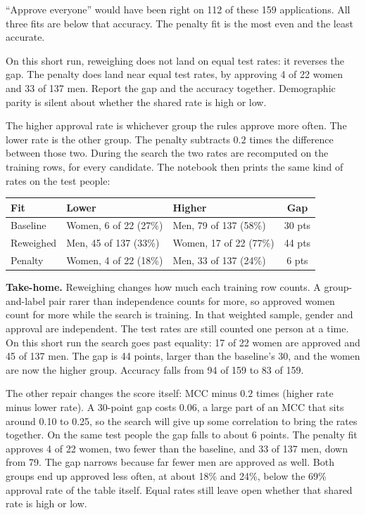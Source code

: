 \documentclass[11pt]{article}
\newcommand{\pct}[1]{\mbox{#1\%}}
\begin{document}
\noindent
``Approve everyone'' would have been right on 112 of these 159 applications. All three fits are below that accuracy. The penalty fit is the most even and the least accurate.

\begin{lesson}
On this short run, reweighing does not land on equal test rates: it reverses the gap. The penalty does land near equal test rates, by approving 4 of 22 women and 33 of 137 men. Report the gap and the accuracy together. Demographic parity is silent about whether the shared rate is high or low.
\end{lesson}

The higher approval rate is whichever group the rules approve more often. The lower rate is the other group. The penalty subtracts \(0.2\) times the difference between those two. During the search the two rates are recomputed on the training rows, for every candidate. The notebook then prints the same kind of rates on the test people:

\begin{table}[H]
\centering
\small
\begin{tabularx}{\textwidth}{@{}l Y Y c@{}}
\toprule
Fit & Lower & Higher & Gap \\
\midrule
Baseline & Women, 6 of 22 (\pct{27}) & Men, 79 of 137 (\pct{58}) & 30 pts \\
Reweighed & Men, 45 of 137 (\pct{33}) & Women, 17 of 22 (\pct{77}) & 44 pts \\
Penalty & Women, 4 of 22 (\pct{18}) & Men, 33 of 137 (\pct{24}) & 6 pts \\
\bottomrule
\end{tabularx}
\end{table}

\begin{plainwords}
\textbf{Take-home.} Reweighing changes how much each training row counts. A group-and-label pair rarer than independence counts for more, so approved women count for more while the search is training. In that weighted sample, gender and approval are independent. The test rates are still counted one person at a time. On this short run the search goes past equality: 17 of 22 women are approved and 45 of 137 men. The gap is 44 points, larger than the baseline's 30, and the women are now the higher group. Accuracy falls from 94 of 159 to 83 of 159.

The other repair changes the score itself: MCC minus \(0.2\) times (higher rate minus lower rate). A 30-point gap costs \(0.06\), a large part of an MCC that sits around 0.10 to 0.25, so the search will give up some correlation to bring the rates together. On the same test people the gap falls to about 6 points. The penalty fit approves 4 of 22 women, two fewer than the baseline, and 33 of 137 men, down from 79. The gap narrows because far fewer men are approved as well. Both groups end up approved less often, at about \pct{18} and \pct{24}, below the \pct{69} approval rate of the table itself. Equal rates still leave open whether that shared rate is high or low.
\end{plainwords}
\end{document}

